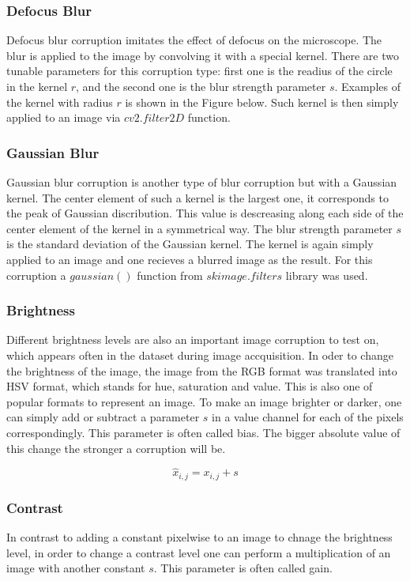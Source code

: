 \subsubsection{Defocus Blur}
Defocus blur corruption imitates the effect of defocus on the microscope. The blur is applied to the image by convolving it with a special kernel. There are two tunable parameters for this corruption type: first one is the readius of the circle in the kernel $r$, and the second one is the blur strength parameter $s$. Examples of the kernel with radius $r$ is shown in the Figure below. Such kernel is then simply applied to an image via $cv2.filter2D$ function.

\subsubsection{Gaussian Blur}
Gaussian blur corruption is another type of blur corruption but with a Gaussian kernel. The center element of such a kernel is the largest one, it corresponds to the peak of Gaussian discribution. This value is descreasing along each side of the center element of the kernel in a symmetrical way. The blur strength parameter $s$ is the standard deviation of the Gaussian kernel. The kernel is again simply applied to an image and one recieves a blurred image as the result. For this corruption a $gaussian()$ function from $skimage.filters$ library was used.

\subsubsection{Brightness}
Different brightness levels are also an important image corruption to test on, which appears often in the dataset during image accquisition. In oder to change the brightness of the image, the image from the RGB format was translated into HSV format, which stands for hue, saturation and value. This is also one of popular formats to represent an image. To make an image brighter or darker, one can simply add or subtract a parameter $s$ in a value channel for each of the pixels correspondingly. This parameter is often called bias. The bigger absolute value of this change the stronger a corruption will be.

\begin{equation}
    \hat{x}_{i, j} = x_{i, j} + s
\end{equation}

\subsubsection{Contrast}
In contrast to adding a constant pixelwise to an image to chnage the brightness level, in order to change a contrast level one can perform a multiplication of an image with another constant $s$. This parameter is often called gain.

